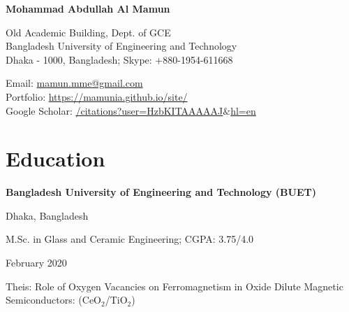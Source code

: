 \documentclass[a4paper,20pt]{article}
\begin{document}

\begin{center}
	\textbf{{\LARGE \color{black} Mohammad Abdullah Al Mamun}}
\end{center}
\vspace{2pt}

	\begin{minipage}{.45\linewidth} 
		\begin{flushleft}
    			Old Academic Building, Dept. of GCE \\ 
    			Bangladesh University of Engineering and Technology \\
    			Dhaka - 1000, Bangladesh; Skype: +880-1954-611668
    		\end{flushleft} 
    	\end{minipage}
    \hfill 
    \begin{minipage}{.50\linewidth}
    		\begin{flushright}
    	 		Email: \href{mailto:mamun.mme@gmail.com} {mamun.mme@gmail.com} \\
    	 		Portfolio: \href{https://mamunia.github.io/site/}{https://mamunia.github.io/site/} \\
    	 		Google Scholar: \href{https://scholar.google.com/citations?user=HzbKITAAAAAJ&hl=en}{/citations?user=HzbKITAAAAAJ$\&$hl=en} 
    		\end{flushright}
    	\end{minipage}

\vspace{5pt}


\section{Education}
    \begin{minipage}{.75\linewidth} \begin{flushleft}
    		\textbf{Bangladesh University of Engineering and Technology (BUET)}
    	\end{flushleft} \end{minipage}
    \hfill 
    \begin{minipage}{.20\linewidth}\begin{flushright}
    	 Dhaka, Bangladesh
    	\end{flushright}\end{minipage}
    	
    	\begin{minipage}{.75\linewidth} \begin{flushleft}
    		M.Sc. in Glass and Ceramic Engineering;  CGPA: 3.75/4.0\\
    	\end{flushleft} \end{minipage}
    \hfill 
    \begin{minipage}{.20\linewidth}\begin{flushright}
    	 February 2020
    	\end{flushright}\end{minipage} 
	 Theis: Role of Oxygen Vacancies on Ferromagnetism in Oxide Dilute Magnetic Semiconductors: (CeO$_2$/TiO$_{2}$)\\
	
\end{document}
